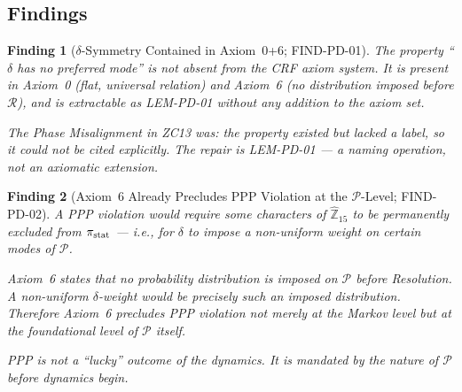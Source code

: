 \documentclass[12pt, a4paper]{article}
\newtheorem{finding}{Finding}[section]
\begin{document}
\subsection{Findings}
\label{zc14:sec:findings}

\begin{finding}[$\delta$-Symmetry Contained in Axiom~0+6;
  FIND-PD-01]
\label{zc14:find:pd-01}
The property ``$\delta$ has no preferred mode'' is not absent
from the CRF axiom system. It is present in Axiom~0
(flat, universal relation) and Axiom~6 (no distribution
imposed before $\mathcal{R}$), and is extractable as
LEM-PD-01 without any addition to the axiom set.

The Phase Misalignment in ZC13 was: the property existed but
lacked a label, so it could not be cited explicitly. The
repair is LEM-PD-01 --- a naming operation, not an axiomatic
extension.
\end{finding}

\begin{finding}[Axiom~6 Already Precludes PPP Violation
  at the $\mathcal{P}$-Level; FIND-PD-02]
\label{zc14:find:pd-02}
A PPP violation would require some characters of
$\widehat{\mathbb{Z}}_{15}$ to be permanently excluded from
$\pi_{\rm stat}$ --- i.e., for $\delta$ to impose a non-uniform
weight on certain modes of $\mathcal{P}$.

Axiom~6 states that \emph{no probability distribution is imposed
on $\mathcal{P}$ before Resolution}. A non-uniform $\delta$-weight
would be precisely such an imposed distribution. Therefore Axiom~6
precludes PPP violation not merely at the Markov level but at the
foundational level of $\mathcal{P}$ itself.

PPP is not a ``lucky'' outcome of the dynamics. It is mandated by
the nature of $\mathcal{P}$ before dynamics begin.
\end{finding}
\end{document}
